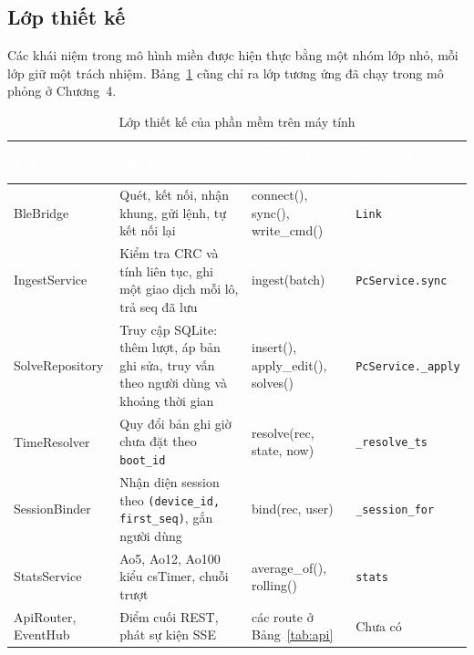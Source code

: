 \subsection{Lớp thiết kế}
Các khái niệm trong mô hình miền được hiện thực bằng một nhóm lớp nhỏ, mỗi lớp giữ một trách nhiệm. Bảng~\ref{tab:classes} cũng chỉ ra lớp tương ứng đã chạy trong mô phỏng ở Chương~4.

\begin{table}[H]
    \centering
    \small
    \renewcommand{\arraystretch}{1.35}
    \caption{Lớp thiết kế của phần mềm trên máy tính}
    \label{tab:classes}
    \begin{tabular}{>{\ttfamily\raggedright\arraybackslash}m{2.9cm} >{\raggedright\arraybackslash}m{4.1cm} >{\ttfamily\raggedright\arraybackslash}m{3.4cm} >{\raggedright\arraybackslash}m{3.3cm}}
        \toprule
        \rowcolor{haitayblue}
        \textcolor{white}{Lớp} & \textcolor{white}{Trách nhiệm} & \textcolor{white}{Phương thức chính} & \textcolor{white}{Trong mô phỏng} \\
        \midrule
        \rowcolor{haitayblue!8}
        BleBridge & Quét, kết nối, nhận khung, gửi lệnh, tự kết nối lại & connect(), sync(), write\_cmd() & \texttt{Link} \\
        IngestService & Kiểm tra CRC và tính liên tục, ghi một giao dịch mỗi lô, trả seq đã lưu & ingest(batch) & \texttt{PcService.sync} \\
        \rowcolor{haitayblue!8}
        SolveRepository & Truy cập SQLite: thêm lượt, áp bản ghi sửa, truy vấn theo người dùng và khoảng thời gian & insert(), apply\_edit(), solves() & \texttt{PcService.\_apply} \\
        TimeResolver & Quy đổi bản ghi giờ chưa đặt theo \texttt{boot\_id} & resolve(rec, state, now) & \texttt{\_resolve\_ts} \\
        \rowcolor{haitayblue!8}
        SessionBinder & Nhận diện session theo \texttt{(device\_id, first\_seq)}, gắn người dùng & bind(rec, user) & \texttt{\_session\_for} \\
        StatsService & Ao5, Ao12, Ao100 kiểu csTimer, chuỗi trượt & average\_of(), rolling() & \texttt{stats} \\
        \rowcolor{haitayblue!8}
        ApiRouter, EventHub & Điểm cuối REST, phát sự kiện SSE & các route ở Bảng~\ref{tab:api} & Chưa có \\
        \bottomrule
    \end{tabular}
\end{table}

